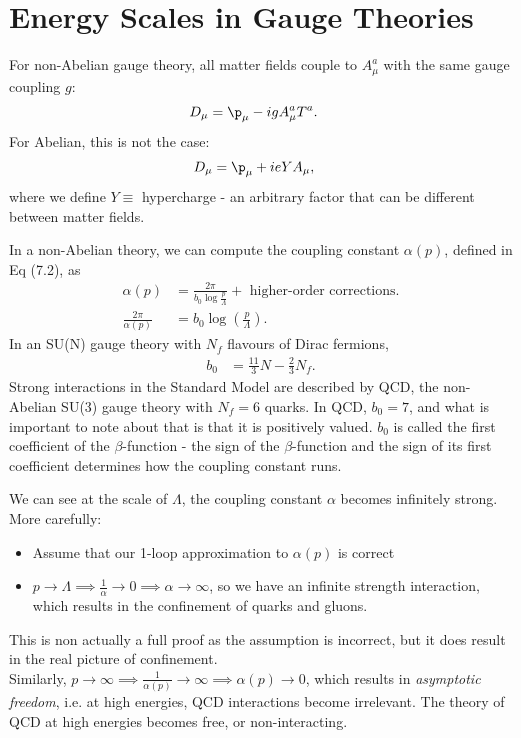 \documentclass[a4paper, 11pt, normalem]{report}
\begin{document}
\chapter{Energy Scales in Gauge Theories}
For non-Abelian gauge theory, all matter fields couple to $A_\mu^a$ with the same gauge coupling $g$:
\begin{align}
    D_\mu &= \p_\mu - igA_\mu^aT^a.
\end{align}
For Abelian, this is not the case:
\begin{align}
    D_\mu &= \p_\mu + ieYA_\mu,
\end{align}
where we define $Y\equiv$ hypercharge - an arbitrary factor that can be different between matter fields.

In a non-Abelian theory, we can compute the coupling constant $\alpha(p)$, defined in Eq (7.2), as
\begin{align}
    \alpha(p) &= \frac{2\pi}{b_0\log\frac{p}{\Lambda}} + \text{ higher-order corrections.} \\
    \frac{2\pi}{\alpha(p)} &= b_0\log\left(\frac{p}{\Lambda}\right).
\end{align}
In an SU(N) gauge theory with $N_f$ flavours of Dirac fermions,
\begin{align}
    b_0 &= \frac{11}{3}N - \frac23 N_f.
\end{align}
Strong interactions in the Standard Model are described by QCD, the non-Abelian SU(3) gauge theory with $N_f=6$ quarks.
In QCD, $b_0=7$, and what is important to note about that is that it is positively valued.
$b_0$ is called the first coefficient of the $\beta$-function - the sign of the $\beta$-function and the sign of its first coefficient determines how the coupling constant runs.
\begin{figure}[H]
    \centering
\end{figure}
We can see at the scale of $\Lambda$, the coupling constant $\alpha$ becomes infinitely strong.
More carefully:
\begin{itemize}
    \item Assume that our 1-loop approximation to $\alpha(p)$ is correct
    \item $p\to\Lambda \implies \frac{1}{\alpha}\to 0\implies\alpha\to\infty$, so we have an infinite strength interaction, which results in the confinement of quarks and gluons.
\end{itemize}
This is non actually a full proof as the assumption is incorrect, but it does result in the real picture of confinement. \\
Similarly, $p\to\infty\implies\frac{1}{\alpha(p)}\to\infty\implies\alpha(p)\to0$, which results in \emph{asymptotic freedom}, i.e. at high energies, QCD interactions become irrelevant.
The theory of QCD at high energies becomes free, or non-interacting.
\end{document}
